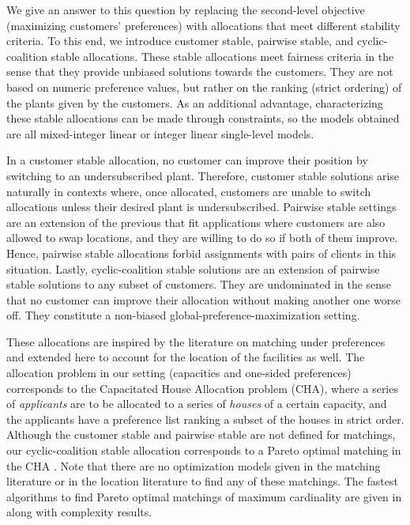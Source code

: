 \documentclass[preprint,11pt,authoryear]{elsarticle}
\begin{document}
We give an answer to this question by replacing the second-level objective (maximizing customers' preferences) with allocations that meet different stability criteria. To this end, we introduce customer stable, pairwise stable, and cyclic-coalition stable allocations. These stable allocations meet fairness criteria in the sense that they provide unbiased solutions towards the customers. They are not based on numeric preference values, but rather on the ranking (strict ordering) of the plants given by the customers. As an additional advantage, characterizing these stable allocations can be made through constraints, so the models obtained are all mixed-integer linear or integer linear single-level models.

In a customer stable allocation, no customer can improve their position by switching to an undersubscribed plant. Therefore, customer stable solutions arise naturally in contexts where, once allocated, customers are unable to switch allocations unless their desired plant is undersubscribed. Pairwise stable settings are an extension of the previous that fit applications where customers are also allowed to swap locations, and they are willing to do so if both of them improve. Hence, pairwise stable allocations forbid assignments with pairs of clients in this situation. Lastly, cyclic-coalition stable solutions are an extension of pairwise stable solutions to any subset of customers. They are undominated in the sense that no customer can improve their allocation without making another one worse off. They constitute a non-biased global-preference-maximization setting.

These allocations are inspired by the literature on matching under preferences \citep[see][]{manlove2013} and extended here to account for the location of the facilities as well. The allocation problem in our setting (capacities and one-sided preferences) corresponds to the Capacitated House Allocation problem (CHA), where a series of \emph{applicants} are to be allocated to a series of \emph{houses} of a certain capacity, and the applicants have a preference list ranking a subset of the houses in strict order. Although the customer stable and pairwise stable are not defined for matchings, our cyclic-coalition stable allocation corresponds to a Pareto optimal matching in the CHA \citep[][Chapter 6]{manlove2013}. Note that there are no optimization models given in the matching literature or in the location literature to find any of these matchings. The fastest algorithms to find Pareto optimal matchings of maximum cardinality are given in \cite{sng2008} along with complexity results.
    
\end{document}
